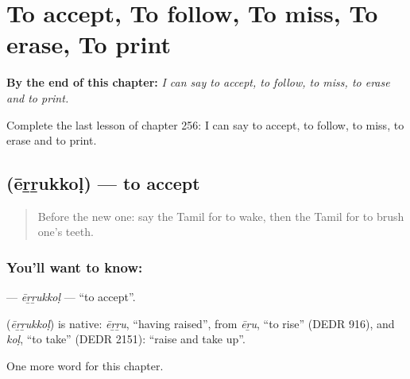 
\chapter{To accept, To follow, To miss, To erase, To print}
\label{ch:ta-to-accept-to-follow-to-miss-to-erase-to-print}

\begin{chapteropening}
\textbf{By the end of this chapter:} \emph{I can say to accept, to follow, to miss, to erase and to print.}

Complete the last lesson of chapter 256: I can say to accept, to follow, to miss, to erase and to print.
\end{chapteropening}

\section[\texorpdfstring{\ta{ஏற்றுக்கொள்} (ēṟṟukkoḷ)}{ஏற்றுக்கொள் (ēṟṟukkoḷ)}]{ (ēṟṟukkoḷ) — to accept}

\label{lesson:TA-C256-errukkol}



\begin{quote}
Before the new one: say the Tamil for to wake, then the Tamil for to brush one's teeth.
\end{quote}

\subsection*{You'll want to know: }
\textbf{} — \emph{ēṟṟukkoḷ} — \textquotedblleft{}to accept\textquotedblright{}.

\begin{cousinweb}
\textbf{} (\emph{ēṟṟukkoḷ}) is native: \emph{ēṟṟu}, \textquotedblleft{}having raised\textquotedblright{}, from \emph{ēṟu}, \textquotedblleft{}to rise\textquotedblright{} (DEDR 916), and \emph{koḷ}, \textquotedblleft{}to take\textquotedblright{} (DEDR 2151): \textquotedblleft{}raise and take up\textquotedblright{}.
\end{cousinweb}

\begin{grammarlens}[title={What you've built}]
One more word for this chapter.
\end{grammarlens}

